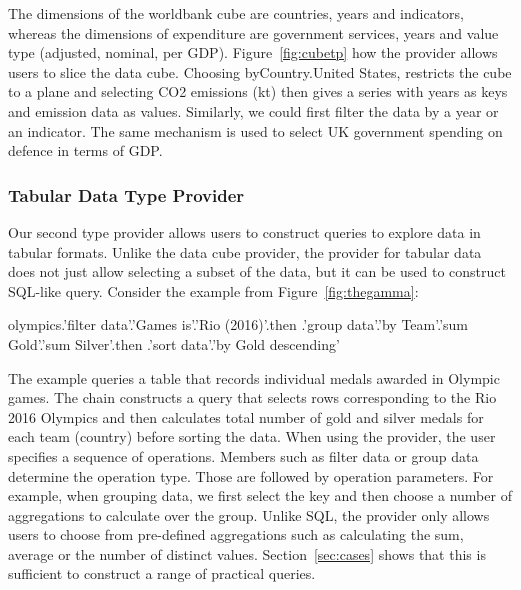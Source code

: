 \documentclass[manuscript,review,anonymous]{acmart}
\newcommand{\ikvd}[1]{{\fontfamily{zi4}\selectfont\small #1}}
\begin{document}
\noindent
The dimensions of the \ikvd{worldbank} cube are countries, years and indicators, whereas the dimensions
of \ikvd{expenditure} are government services, years and value type (adjusted, nominal,
per GDP).  Figure~\ref{fig:cubetp} how the provider allows users to slice the data cube.
Choosing \ikvd{byCountry.\textquotesingle United States\textquotesingle},
restricts the cube to a plane and selecting \ikvd{\textquotesingle CO2 emissions (kt)\textquotesingle}
then gives a series with years as keys and emission data as values. Similarly, we could first filter the
data by a year or an indicator. The same mechanism is used to select UK government spending on
defence in terms of GDP.

\subsubsection*{Tabular Data Type Provider}

Our second type provider allows users to construct queries to explore data in tabular formats.
Unlike the data cube provider, the provider for tabular data does not just
allow selecting a subset of the data, but it can be used to construct SQL-like query. Consider
the example from Figure~\ref{fig:thegamma}:

\begin{thegamma}
olympics.'filter data'.'Games is'.'Rio (2016)'.then
  .'group data'.'by Team'.'sum Gold'.'sum Silver'.then
  .'sort data'.'by Gold descending'
\end{thegamma}

\noindent
The example queries a table that records individual medals awarded in Olympic games.
The chain constructs a query that selects rows corresponding to the Rio 2016 Olympics and then
calculates total number of gold and silver medals for each team (country) before sorting the data.
%
When using the provider, the user specifies a sequence of operations. Members such as
\ikvd{\textquotesingle filter data\textquotesingle} or \ikvd{\textquotesingle group data\textquotesingle}
determine the operation type. Those are followed by operation parameters. For example, when grouping
data, we first select the key and then choose a number of aggregations to calculate over the group.
Unlike SQL, the provider only allows users to choose from pre-defined aggregations such as
calculating the sum, average or the number of distinct values.
Section~\ref{sec:cases} shows that this is sufficient to construct a range of practical queries.
\end{document}
